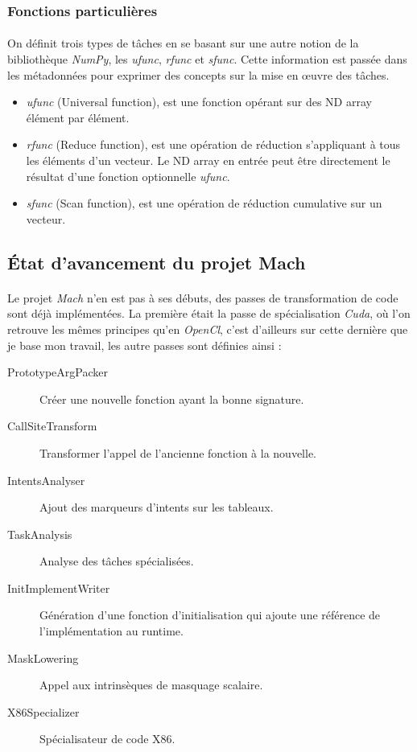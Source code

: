 \subsubsection{Fonctions particulières\label{particular_function}}
\paragraph{}
On définit trois types de tâches en se basant sur une autre notion de la
bibliothèque \emph{NumPy}, les \emph{ufunc}, \emph{rfunc} et \emph{sfunc}. Cette
information est passée dans les métadonnées pour exprimer des concepts sur la
mise en \oe{}uvre des tâches.

\begin{itemize}
\item \emph{ufunc} (Universal function), est une fonction opérant sur des ND
array élément par élément.

\item \emph{rfunc} (Reduce function), est une opération de réduction
s'appliquant à tous les éléments d'un vecteur. Le ND array en entrée peut être
directement le résultat d'une fonction optionnelle \emph{ufunc}.

\item \emph{sfunc} (Scan function), est une opération de réduction cumulative
sur un vecteur.
\end{itemize}

\subsection{État d'avancement du projet Mach}
\paragraph{}
Le projet \emph{Mach} n'en est pas à ses débuts, des passes de transformation de
code sont déjà implémentées. La première était la passe de spécialisation
\emph{Cuda}, où l'on retrouve les mêmes principes qu'en \emph{OpenCl}, c'est
d'ailleurs sur cette dernière que je base mon travail, les autre passes sont
définies ainsi :
\begin{description}
\item[PrototypeArgPacker] Créer une nouvelle fonction ayant la bonne signature.
\item[CallSiteTransform] Transformer l'appel de l’ancienne fonction à la nouvelle.
\item[IntentsAnalyser] Ajout des marqueurs d'intents sur les tableaux.
\item[TaskAnalysis] Analyse des tâches spécialisées.
\item[InitImplementWriter] Génération d'une fonction d'initialisation qui ajoute
   une référence de l'implémentation au runtime.
\item[MaskLowering] Appel aux intrinsèques de masquage scalaire.
\item[X86Specializer] Spécialisateur de code X86.
\end{description}


